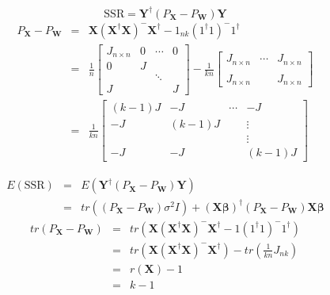 \documentclass{article}
\begin{document}
\bigskip

\begin{equation*}
\text{SSR}=\mathbf{Y}^{\dagger }\left( P_{\mathbf{X}}-P_{\mathbf{W}}\right) 
\mathbf{Y}
\end{equation*}%
\begin{eqnarray*}
P_{\mathbf{X}}-P_{\mathbf{W}} &=&\mathbf{X}\left( \mathbf{X}^{\dagger }%
\mathbf{X}\right) ^{-}\mathbf{X}^{\dagger }-1_{nk}\left( 1^{\dagger
}1\right) ^{-}1^{\dagger } \\
&=&\frac{1}{n}\left[ 
\begin{array}{cccc}
J_{n\times n} & 0 & \cdots & 0 \\ 
0 & J &  &  \\ 
&  & \ddots &  \\ 
J &  &  & J%
\end{array}%
\right] -\frac{1}{kn}\left[ 
\begin{array}{ccc}
J_{n\times n} & \cdots & J_{n\times n} \\ 
&  &  \\ 
J_{n\times n} &  & J_{n\times n}%
\end{array}%
\right] \\
&=&\frac{1}{kn}\left[ 
\begin{array}{cccc}
\left( k-1\right) J & -J & \cdots & -J \\ 
-J & \left( k-1\right) J &  & \vdots \\ 
&  &  & \vdots \\ 
-J & -J &  & \left( k-1\right) J%
\end{array}%
\right]
\end{eqnarray*}

\begin{eqnarray*}
E\left( \text{SSR}\right) &=&E\left( \mathbf{Y}^{\dagger }\left( P_{\mathbf{X%
}}-P_{\mathbf{W}}\right) \mathbf{Y}\right) \\
&=&tr\left( \left( P_{\mathbf{X}}-P_{\mathbf{W}}\right) \sigma ^{2}I\right)
+\left( \mathbf{X\beta }\right) ^{\dagger }\left( P_{\mathbf{X}}-P_{\mathbf{W%
}}\right) \mathbf{X\beta }
\end{eqnarray*}%
\begin{eqnarray*}
tr\left( P_{\mathbf{X}}-P_{\mathbf{W}}\right) &=&tr\left( \mathbf{X}\left( 
\mathbf{X}^{\dagger }\mathbf{X}\right) ^{-}\mathbf{X}^{\dagger }-1\left(
1^{\dagger }1\right) ^{-}1^{\dagger }\right) \\
&=&tr\left( \mathbf{X}\left( \mathbf{X}^{\dagger }\mathbf{X}\right) ^{-}%
\mathbf{X}^{\dagger }\right) -tr\left( \frac{1}{kn}J_{nk}\right) \\
&=&r\left( \mathbf{X}\right) -1 \\
&=&k-1
\end{eqnarray*}
\end{document}
